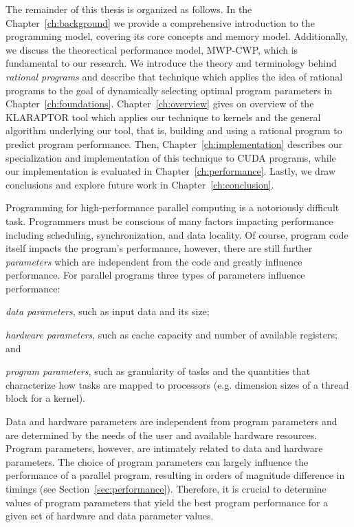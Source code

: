 The remainder of this thesis is organized as follows.
In the Chapter~\ref{ch:background} we provide a comprehensive introduction to the {\cuda} programming model, 
covering its core concepts and memory model. Additionally, we discuss the theorectical performance model, MWP-CWP,
which is fundamental to our research.  
We introduce the theory
and terminology behind \textit{rational programs} and describe that technique which applies
the idea of rational programs to the goal of dynamically selecting optimal program parameters 
in Chapter~\ref{ch:foundations}.
Chapter~\ref{ch:overview} gives on overview of the KLARAPTOR tool
which applies our technique to {\cuda} kernels and
the general algorithm underlying our tool, that is, 
building and using a rational program to predict program performance.
Then, Chapter~\ref{ch:implementation} describes our
specialization and implementation of this technique to CUDA programs,
while our implementation is evaluated
in Chapter~\ref{ch:performance}.
Lastly, we draw conclusions and explore future work in Chapter~\ref{ch:conclusion}.


\iffalse


Programming for high-performance parallel computing is a notoriously
difficult task. Programmers must be conscious of many factors impacting
performance including scheduling, synchronization, and data locality.
Of course, program code itself impacts the program's performance, however, 
there are still further \textit{parameters} which are independent from the code
and greatly influence performance. 
%
For parallel programs three types of parameters influence performance:
\begin{inparaenum}[(i)]
	\item {\em data parameters}, such as input data and its size;
	\item {\em hardware parameters}, such as cache capacity and number of 
	available registers; and
	\item {\em program parameters}, such as granularity of tasks and 
	the quantities that characterize how tasks are
	mapped to processors (e.g. dimension sizes of a thread block for a {\cuda} kernel).
\end{inparaenum}

Data and hardware parameters are independent from program parameters
and are determined by the needs of the user and available hardware
resources.  Program parameters, however, are intimately related to
data and hardware parameters. The choice of program parameters can
largely influence the performance of a parallel program, resulting in 
orders of magnitude difference in timings (see Section~\ref{sec:performance}).
Therefore, it is crucial to determine values of program
parameters that yield the best program performance for a given set of
hardware and data parameter values.

